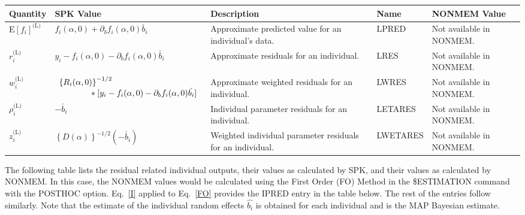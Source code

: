 \documentclass{article}
\begin{document}
\begin{center}
\begin{tabular}{|p{0.75in}|p{3.25in}|p{1.1in}|p{0.85in}|p{1.0in}|}
\hline
\hline
  {\bf Quantity}
    & {\bf SPK Value}
    & {\bf Description}
    & {\bf Name}
    & {\bf NONMEM Value} \\
  \hline
  \hline
  $\mbox{E} \left[ f_i \right]^{\mbox{(L)}}$
    & $f_i(\alpha, 0)+ \partial_b f_i(\alpha, 0) \check{b_i}$
    & Approximate predicted value for an individual's data.
    & LPRED 
    & Not available in NONMEM. \\
  \hline
  $r^{\mbox{(L)}}_i$
    & $y_i - f_i(\alpha, 0)- \partial_b f_i(\alpha, 0) \check{b_i}$
    & Approximate residuals for an individual.
    & LRES
    & Not available in NONMEM. \\
  \hline
  $w^{\mbox{(L)}}_i$
    & $\begin{array}{l}
        \left\{ R_i(\alpha, 0) \right\}^{-1/2} \\
        \mbox{\hspace{0.5in}}
        \ast [ y_i - f_i(\alpha, 0)- \partial_b f_i(\alpha, 0) \check{b_i} ]
      \end{array} $
    & Approximate weighted residuals for an individual.
    & LWRES 
    & Not available in NONMEM. \\
  \hline
  $\rho^{\mbox{(L)}}_i$
    & $-\check{b_i}$
    & Individual parameter residuals for an individual.
    & LETARES
    & Not available in NONMEM. \\
  \hline
  $z^{\mbox{(L)}}_i$
    & $\left\{ D(\alpha) \right\}^{-1/2} ( - \check{b_i} )$
    & Weighted individual parameter residuals for an individual.
    & LWETARES
    & Not available in NONMEM. \\
  \hline
  \hline
\end{tabular}
\end{center}

\newpage

The following table lists the residual related individual outputs, their
values as calculated by SPK, and their values as calculated by NONMEM.
In this case, the NONMEM values would be calculated using 
the First Order (FO) Method in the \$ESTIMATION command with 
the POSTHOC option. 
Eq.~\ref{I} applied to Eq.~\ref{FO} provides the IPRED entry in the table
below. The rest of the entries follow similarly.
Note that the estimate of the individual random
effects $\hat{b_i}$ is obtained for each individual and is the MAP Bayesian 
estimate.
\end{document}
